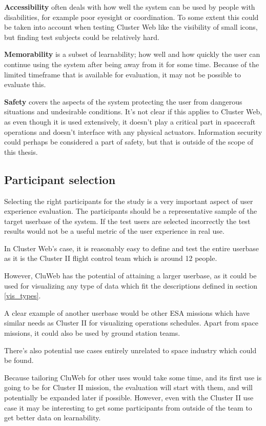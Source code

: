 \textbf{Accessibility} often deals with how well the system can be used by people with disabilities, for example poor eyesight or coordination. To some extent this could be taken into account when testing Cluster Web like the visibility of small icons, but finding test subjects could be relatively hard.

\textbf{Memorability} is  a subset of learnability; how well and how quickly the user can continue using the system after being away from it for some time. Because of the limited timeframe that is available for evaluation, it may not be possible to evaluate this.

\textbf{Safety} covers the aspects of the system protecting the user from dangerous situations and undesirable conditions. It's not clear if this applies to Cluster Web, as even though it is used extensively, it doesn't play a critical part in spacecraft operations and doesn't interface with any physical actuators. Information security could perhaps be considered a part of safety, but that is outside of the scope of this thesis.

\cite{rubin2008handbook, bevanevaluation, albert2013measuring}

\subsection{Participant selection}
Selecting the right participants for the study is a very important aspect of user experience evaluation. The participants should be a representative sample of the target userbase of the system. If the test users are selected incorrectly the test results would not be a useful metric of the user experience in real use.

In Cluster Web's case, it is reasonably easy to  define and test the entire userbase as it is the Cluster II flight control team which is around 12 people.

However, CluWeb has the potential of attaining a larger userbase, as it could be used for visualizing any type of data which fit the descriptions defined in section \ref{vis_types}. 

A clear example of another userbase would be other ESA missions which have similar needs as Cluster II for visualizing operations schedules. Apart from space missions, it could also be used by ground station teams.

There's also potential use cases entirely unrelated to space industry which could be found.

Because tailoring CluWeb for other uses would take some time, and its first use is going to be for Cluster II mission, the evaluation will start with them, and will potentially be expanded later if possible. However, even with the Cluster II use case it may be interesting to get some participants from outside of the team to get better data on learnability.

